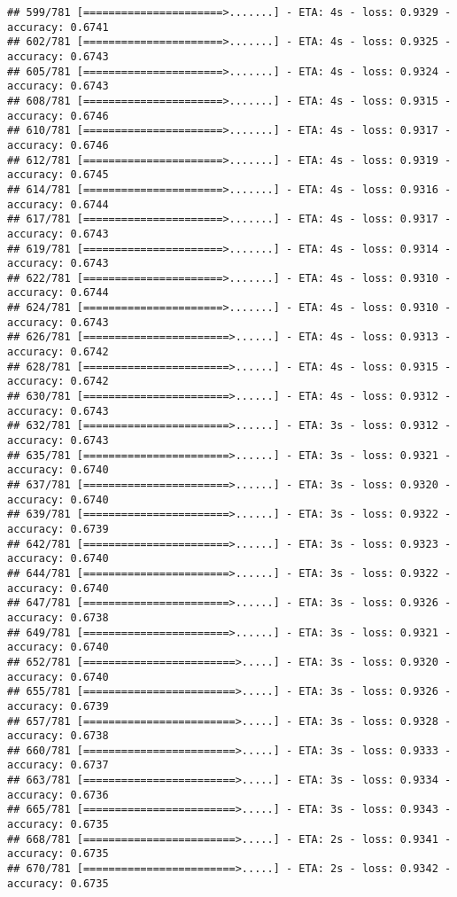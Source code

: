 \documentclass[
]{article}
\begin{document}
\begin{verbatim}
## 599/781 [======================>.......] - ETA: 4s - loss: 0.9329 - accuracy: 0.6741
## 602/781 [======================>.......] - ETA: 4s - loss: 0.9325 - accuracy: 0.6743
## 605/781 [======================>.......] - ETA: 4s - loss: 0.9324 - accuracy: 0.6743
## 608/781 [======================>.......] - ETA: 4s - loss: 0.9315 - accuracy: 0.6746
## 610/781 [======================>.......] - ETA: 4s - loss: 0.9317 - accuracy: 0.6746
## 612/781 [======================>.......] - ETA: 4s - loss: 0.9319 - accuracy: 0.6745
## 614/781 [======================>.......] - ETA: 4s - loss: 0.9316 - accuracy: 0.6744
## 617/781 [======================>.......] - ETA: 4s - loss: 0.9317 - accuracy: 0.6743
## 619/781 [======================>.......] - ETA: 4s - loss: 0.9314 - accuracy: 0.6743
## 622/781 [======================>.......] - ETA: 4s - loss: 0.9310 - accuracy: 0.6744
## 624/781 [======================>.......] - ETA: 4s - loss: 0.9310 - accuracy: 0.6743
## 626/781 [=======================>......] - ETA: 4s - loss: 0.9313 - accuracy: 0.6742
## 628/781 [=======================>......] - ETA: 4s - loss: 0.9315 - accuracy: 0.6742
## 630/781 [=======================>......] - ETA: 4s - loss: 0.9312 - accuracy: 0.6743
## 632/781 [=======================>......] - ETA: 3s - loss: 0.9312 - accuracy: 0.6743
## 635/781 [=======================>......] - ETA: 3s - loss: 0.9321 - accuracy: 0.6740
## 637/781 [=======================>......] - ETA: 3s - loss: 0.9320 - accuracy: 0.6740
## 639/781 [=======================>......] - ETA: 3s - loss: 0.9322 - accuracy: 0.6739
## 642/781 [=======================>......] - ETA: 3s - loss: 0.9323 - accuracy: 0.6740
## 644/781 [=======================>......] - ETA: 3s - loss: 0.9322 - accuracy: 0.6740
## 647/781 [=======================>......] - ETA: 3s - loss: 0.9326 - accuracy: 0.6738
## 649/781 [=======================>......] - ETA: 3s - loss: 0.9321 - accuracy: 0.6740
## 652/781 [========================>.....] - ETA: 3s - loss: 0.9320 - accuracy: 0.6740
## 655/781 [========================>.....] - ETA: 3s - loss: 0.9326 - accuracy: 0.6739
## 657/781 [========================>.....] - ETA: 3s - loss: 0.9328 - accuracy: 0.6738
## 660/781 [========================>.....] - ETA: 3s - loss: 0.9333 - accuracy: 0.6737
## 663/781 [========================>.....] - ETA: 3s - loss: 0.9334 - accuracy: 0.6736
## 665/781 [========================>.....] - ETA: 3s - loss: 0.9343 - accuracy: 0.6735
## 668/781 [========================>.....] - ETA: 2s - loss: 0.9341 - accuracy: 0.6735
## 670/781 [========================>.....] - ETA: 2s - loss: 0.9342 - accuracy: 0.6735

\end{verbatim}
\end{document}
